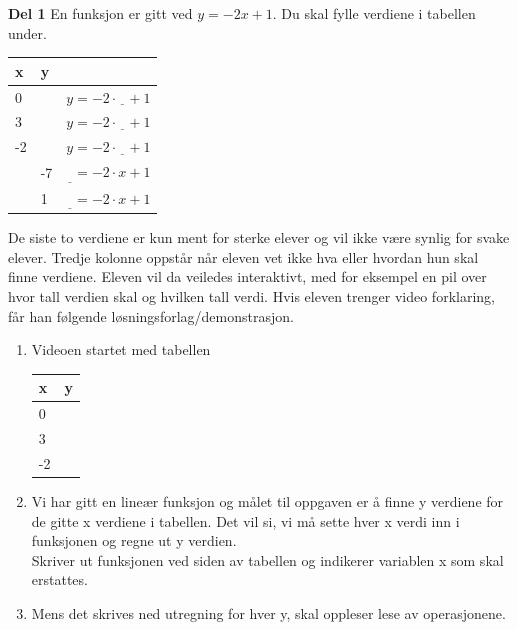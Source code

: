 \documentclass[12pt,twoside,onecolumn]{article}
\begin{document}
\begin{Exercise}
\textbf{Del 1} \newline
En funksjon er gitt ved $y = -2x + 1$. Du skal fylle verdiene i tabellen under.
\begin{center}
    \begin{tabular}{ | l | l | p{3cm} |}
    \hline
    x  &  y  &  \\ \hline
    0  &     & {\color{Maroon} $y = -2\cdot \underline{\phantom{x}}  + 1$} \\ \hline
    3  &     & {\color{Maroon} $y = -2\cdot \underline{\phantom{x}}  + 1$} \\ \hline
    -2 &     & {\color{Maroon} $y = -2\cdot \underline{\phantom{x}}  + 1$} \\ \hline
	   & -7  & {\color{Maroon} $\underline{\phantom{y}} = -2\cdot x  + 1$} \\ \hline
	   &  1   & {\color{Maroon} $\underline{\phantom{y}} = -2\cdot x  + 1$} \\ \hline	   
    \end{tabular}
\end{center}
{\color{Maroon} De siste to verdiene er kun ment for sterke elever og vil ikke være synlig for svake elever.}\newline 
{\color{Cerulean} Tredje kolonne oppstår når eleven vet ikke hva eller hvordan hun skal finne verdiene. Eleven vil da veiledes interaktivt, med for eksempel en pil over hvor tall verdien skal og hvilken tall verdi.}
\newline
\newline
Hvis eleven trenger video forklaring, får han følgende løsningsforlag/demonstrasjon.
\begin{enumerate}
\item {\color{PineGreen}Videoen startet med tabellen}
    \begin{tabular}{ | l | l |}
    \hline
    x  &  y  \\ \hline
    0  &     \\ \hline
    3  &   \\ \hline
    -2 &   \\ \hline
	\end{tabular}
\item {\color{Maroon}Vi har gitt en lineær funksjon og målet til oppgaven er å finne y verdiene for de gitte x verdiene i tabellen. Det vil si, vi må sette hver x verdi inn i funksjonen og regne ut y verdien.}\\
{\color{PineGreen}Skriver ut funksjonen ved siden av tabellen og indikerer variablen x som skal erstattes.}
\item {\color{PineGreen}Mens det skrives ned utregning for hver y, skal oppleser lese av operasjonene.}
\end{enumerate}


\end{Exercise}
\end{document}
